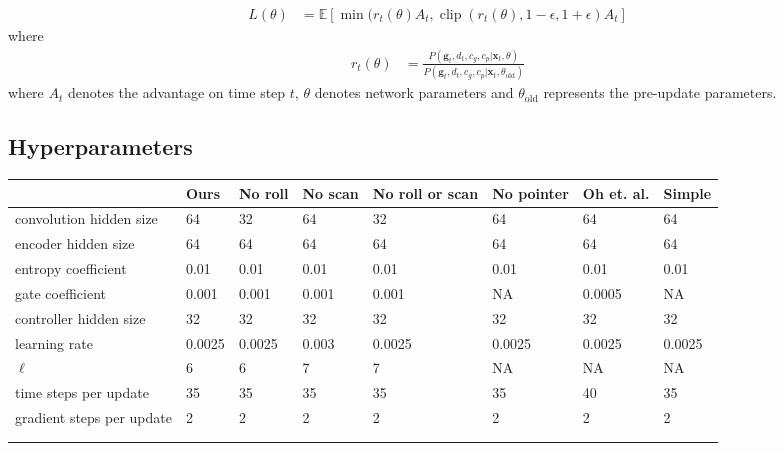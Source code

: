 \documentclass{article}
\DeclareMathOperator{\clip}{clip}
\begin{document}
\begin{align}
	L(\theta) &= \mathbb{E}[\min(r_t(\theta)A_t, \clip\left(r_t(\theta), 1 - \epsilon, 1 +
	\epsilon\right)A_t]
\end{align}
where
\begin{align}
	r_t(\theta) &= \frac{P(\mathbf{g}_t, d_t, c_g, c_p|\mathbf{x}_t, \theta)}{P(\mathbf{g}_t, d_t, c_g, c_p|\mathbf{x}_t, \theta_{\text{old}})}
\end{align}
where $A_t$ denotes the advantage on time step $t$, $\theta$ denotes network parameters and $\theta_\text{old}$ represents the pre-update parameters.
\begin{landscape}
\subsection{Hyperparameters}

\begin{tabular}{l|lllllll}
                          & Ours   & No roll & No scan & No roll or scan & No pointer & Oh et. al. & Simple \\
                          \hline

convolution hidden size   & 64     & 32      & 64      & 32              & 64         & 64         & 64     \\
encoder hidden size       & 64     & 64      & 64      & 64              & 64         & 64         & 64     \\
entropy coefficient       & 0.01   & 0.01    & 0.01    & 0.01            & 0.01       & 0.01       & 0.01   \\
gate coefficient          & 0.001  & 0.001   & 0.001   & 0.001           & NA         & 0.0005     & NA     \\
controller hidden size    & 32     & 32      & 32      & 32              & 32         & 32         & 32     \\
learning rate             & 0.0025 & 0.0025  & 0.003   & 0.0025          & 0.0025     & 0.0025     & 0.0025 \\
$\ell$                    & 6      & 6       & 7       & 7               & NA         & NA         & NA     \\
time steps per update     & 35     & 35      & 35      & 35              & 35         & 40         & 35     \\
gradient steps per update & 2      & 2       & 2       & 2               & 2          & 2          & 2      \\
                          &        &         &         &                 &            &            &        \\
                          &        &         &         &                 &            &            &       
\end{tabular}
\end{landscape}
\end{document}
